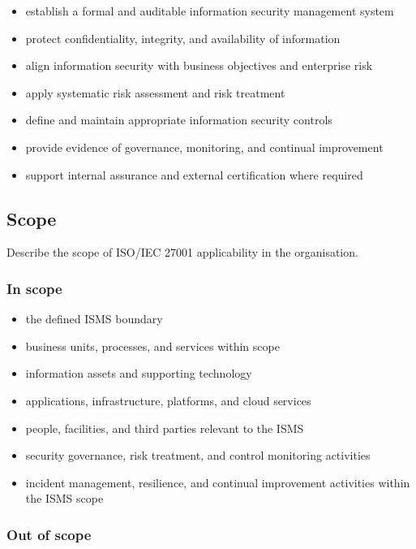 \documentclass[
  letterpaper,
  DIV=11,
  numbers=noendperiod]{scrartcl}
\providecommand{\tightlist}{%
  \setlength{\itemsep}{0pt}\setlength{\parskip}{0pt}}
\begin{document}
\begin{itemize}
\tightlist
\item
  establish a formal and auditable information security management
  system
\item
  protect confidentiality, integrity, and availability of information
\item
  align information security with business objectives and enterprise
  risk
\item
  apply systematic risk assessment and risk treatment
\item
  define and maintain appropriate information security controls
\item
  provide evidence of governance, monitoring, and continual improvement
\item
  support internal assurance and external certification where required
\end{itemize}

\subsection{Scope}\label{scope}

Describe the scope of ISO/IEC 27001 applicability in the organisation.

\subsubsection{In scope}\label{in-scope}

\begin{itemize}
\tightlist
\item
  the defined ISMS boundary
\item
  business units, processes, and services within scope
\item
  information assets and supporting technology
\item
  applications, infrastructure, platforms, and cloud services
\item
  people, facilities, and third parties relevant to the ISMS
\item
  security governance, risk treatment, and control monitoring activities
\item
  incident management, resilience, and continual improvement activities
  within the ISMS scope
\end{itemize}

\subsubsection{Out of scope}\label{out-of-scope}
\end{document}
